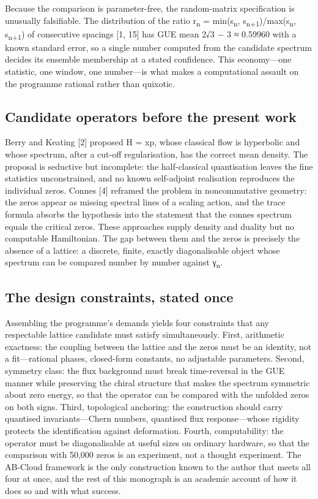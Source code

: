 \documentclass[10pt]{article}
\begin{document}
Because the comparison is parameter-free, the random-matrix specification is unusually falsifiable. The distribution of the ratio r\textsubscript{n} = min(s\textsubscript{n}, s\textsubscript{n+1})/max(s\textsubscript{n}, s\textsubscript{n+1}) of consecutive spacings [1, 15] has GUE mean 2√3 − 3 ≈ 0.59960 with a known standard error, so a single number computed from the candidate spectrum decides its ensemble membership at a stated confidence. This economy---one statistic, one window, one number---is what makes a computational assault on the programme rational rather than quixotic.

\subsection{Candidate operators before the present work}\label{sec:22}
Berry and Keating [2] proposed H = xp, whose classical flow is hyperbolic and whose spectrum, after a cut-off regularisation, has the correct mean density. The proposal is seductive but incomplete: the half-classical quantisation leaves the fine statistics unconstrained, and no known self-adjoint realisation reproduces the individual zeros. Connes [4] reframed the problem in noncommutative geometry: the zeros appear as missing spectral lines of a scaling action, and the trace formula absorbs the hypothesis into the statement that the connes spectrum equals the critical zeros. These approaches supply density and duality but no computable Hamiltonian. The gap between them and the zeros is precisely the absence of a lattice: a discrete, finite, exactly diagonalisable object whose spectrum can be compared number by number against γ\textsubscript{n}.

\subsection{The design constraints, stated once}\label{sec:23}
Assembling the programme's demands yields four constraints that any respectable lattice candidate must satisfy simultaneously. First, arithmetic exactness: the coupling between the lattice and the zeros must be an identity, not a fit---rational phases, closed-form constants, no adjustable parameters. Second, symmetry class: the flux background must break time-reversal in the GUE manner while preserving the chiral structure that makes the spectrum symmetric about zero energy, so that the operator can be compared with the unfolded zeros on both signs. Third, topological anchoring: the construction should carry quantised invariants---Chern numbers, quantised flux response---whose rigidity protects the identification against deformation. Fourth, computability: the operator must be diagonalisable at useful sizes on ordinary hardware, so that the comparison with 50,000 zeros is an experiment, not a thought experiment. The AB-Cloud framework is the only construction known to the author that meets all four at once, and the rest of this monograph is an academic account of how it does so and with what success.
\end{document}
